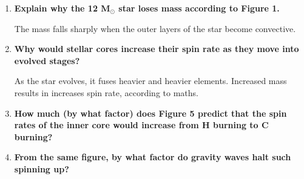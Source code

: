 \documentclass[11pt]{article}
\begin{document}
\begin{enumerate}
    \item \textbf{Explain why the 12 M$_{\odot}$ star loses mass according to
        Figure 1.}

        The mass falls sharply when the outer layers of the star
        become convective.

    \item \textbf{Why would stellar cores increase their spin rate as
        they move into evolved stages?}

        As the star evolves, it fuses heavier and heavier elements.
        Increased mass results in increases spin rate, according to
        maths.

    \item \textbf{How much (by what factor) does Figure 5 predict
        that the spin rates of the inner core would increase from
        H burning to C burning?}

    \item \textbf{From the same figure, by what factor do gravity
        waves halt such spinning up?}

\end{enumerate}
\end{document}
